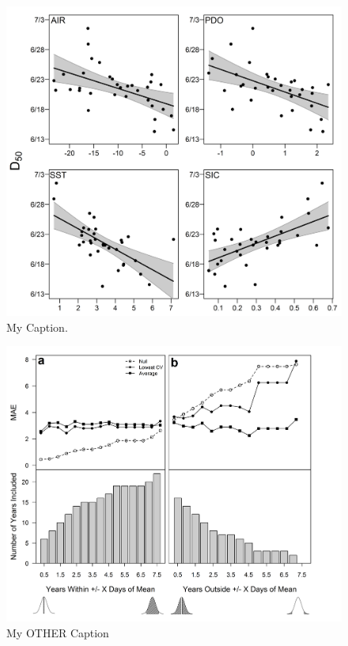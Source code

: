 \documentclass[12pt,]{book}
\theoremstyle{definition}
\theoremstyle{definition}
\theoremstyle{definition}
\theoremstyle{remark}
\begin{document}
\pagebreak

\begin{figure}
  \includegraphics{img/Ch2/relationships.png}
  \caption{My Caption.}
  \label{fig:relationships}
\end{figure}

\newpage

\begin{figure}
  \includegraphics{img/Ch2/mae-subsets.png}
  \caption{My OTHER Caption}
  \label{fig:mae-subsets}
\end{figure}
\end{document}
